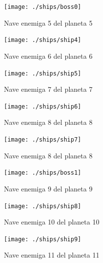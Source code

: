 \documentclass[a4paper,10pt]{article}
\begin{document}
\begin{figure}[htbl!]

\begin{minipage}[b]{0.5\linewidth}
\centering
\texttt{[image: ./ships/boss0]}
\caption{Nave enemiga 5 del planeta 5} \label{figura5}
\end{minipage}
\hspace{0.5cm}
\begin{minipage}[b]{0.5\linewidth}
\centering
\texttt{[image: ./ships/ship4]}
\caption{Nave enemiga 6 del planeta 6} \label{figura6}
\end{minipage}

\end{figure}

\begin{figure}

\begin{minipage}[b]{0.5\linewidth}
\centering
\texttt{[image: ./ships/ship5]}
\caption{Nave enemiga 7 del planeta 7} \label{figura7}
\end{minipage}
\hspace{0.5cm}
\begin{minipage}[b]{0.5\linewidth}
\centering
\texttt{[image: ./ships/ship6]}
\caption{Nave enemiga 8 del planeta 8} \label{figura8}
\end{minipage}

\end{figure}


\begin{figure}

\begin{minipage}[b]{0.5\linewidth}
\centering
\texttt{[image: ./ships/ship7]}
\caption{Nave enemiga 8 del planeta 8} \label{figura8}
\end{minipage}
\hspace{0.5cm}
\begin{minipage}[b]{0.5\linewidth}
\centering
\texttt{[image: ./ships/boss1]}
\caption{Nave enemiga 9 del planeta 9} \label{figura9}
\end{minipage}

\end{figure}

\begin{figure}

\begin{minipage}[b]{0.5\linewidth}
\centering
\texttt{[image: ./ships/ship8]}
\caption{Nave enemiga 10 del planeta 10} \label{figura10}
\end{minipage}
\hspace{0.5cm}
\begin{minipage}[b]{0.5\linewidth}
\centering
\texttt{[image: ./ships/ship9]}
\caption{Nave enemiga 11 del planeta 11} \label{figura11}
\end{minipage}

\end{figure}
\end{document}
